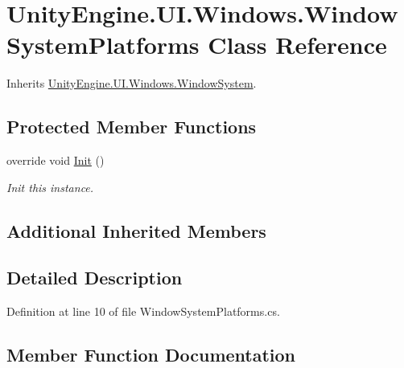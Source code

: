 \hypertarget{class_unity_engine_1_1_u_i_1_1_windows_1_1_window_system_platforms}{}\section{Unity\+Engine.\+U\+I.\+Windows.\+Window\+System\+Platforms Class Reference}
\label{class_unity_engine_1_1_u_i_1_1_windows_1_1_window_system_platforms}


Inherits \hyperlink{class_unity_engine_1_1_u_i_1_1_windows_1_1_window_system}{Unity\+Engine.\+U\+I.\+Windows.\+Window\+System}.

\subsection*{Protected Member Functions}
\begin{DoxyCompactItemize}
\item 
override void \hyperlink{class_unity_engine_1_1_u_i_1_1_windows_1_1_window_system_platforms_aa3acd3efed9d28fd8a9528fdf9114eb6}{Init} ()
\begin{DoxyCompactList}\small\item\em Init this instance. \end{DoxyCompactList}\end{DoxyCompactItemize}
\subsection*{Additional Inherited Members}


\subsection{Detailed Description}


Definition at line 10 of file Window\+System\+Platforms.\+cs.



\subsection{Member Function Documentation}
\hypertarget{class_unity_engine_1_1_u_i_1_1_windows_1_1_window_system_platforms_aa3acd3efed9d28fd8a9528fdf9114eb6}{}
